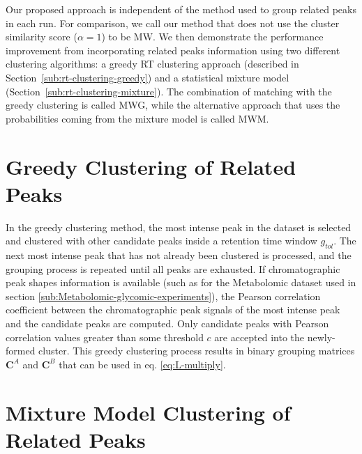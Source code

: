 Our proposed approach is independent of the method used to group related peaks in each run. For comparison, we call our method that does not use the cluster similarity score ($\alpha=1$) to be \ac{MW}. We then demonstrate the performance improvement from incorporating related peaks information using two different clustering algorithms: a greedy RT clustering approach (described in Section~\ref{sub:rt-clustering-greedy}) and a statistical mixture model (Section~\ref{sub:rt-clustering-mixture}). The combination of matching with the greedy clustering is called MWG, while the alternative approach that uses the probabilities coming from the mixture model is called MWM.

\section{Greedy Clustering of Related Peaks\label{sub:rt-clustering-greedy}}

In the greedy clustering method, the most intense peak in the dataset is selected and clustered with other candidate peaks inside a retention time window $g_{tol}$. The next most intense peak that has not already been clustered is processed, and the grouping process is repeated until all peaks are exhausted. If chromatographic peak shapes information is available (such as for the Metabolomic dataset used in section \ref{sub:Metabolomic-glycomic-experiments}), the Pearson correlation coefficient between the chromatographic peak signals of the most intense peak and the candidate peaks are computed. Only candidate peaks with Pearson correlation values greater than some threshold $c$ are accepted into the newly-formed cluster. This greedy clustering process results in binary grouping matrices $\mathbf{C}^A$ and $\mathbf{C}^B$ that can be used in eq. \ref{eq:L-multiply}.

\section{Mixture Model Clustering of Related Peaks\label{sub:rt-clustering-mixture}}

